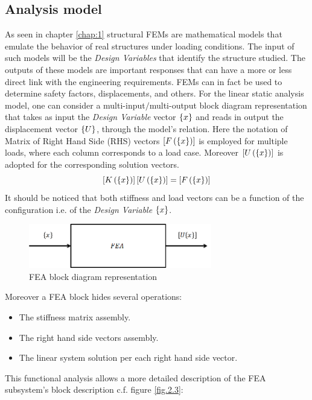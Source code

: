 \subsection {Analysis model}
As seen in chapter \ref{chap:1} structural FEMs are mathematical models that emulate the behavior of real structures under loading conditions. The input of such models will be the \textit{Design Variables} that identify the structure studied. The outputs of these models are important responses that can have a more or less direct link with the engineering requirements. FEMs can in fact be used to determine safety factors, displacements, and others. For the linear static analysis model, one can consider a multi-input$/$multi-output block diagram representation that takes as input the \textit{Design Variable} vector $\left\lbrace{x}\right \rbrace$ and reads in output the displacement vector $\left\lbrace{U}\right \rbrace$, through the model's relation. Here the notation of Matrix of Right Hand Side (RHS) vectors $\left[{F\left(\left\lbrace{x}\right \rbrace\right)}\right]$ is employed for multiple loads, where each column corresponds to a load case. Moreover $\left[{U\left(\left\lbrace{x}\right \rbrace\right)}\right]$ is adopted for the corresponding solution vectors.
\begin{equation}
\label{eq2.1}
\left[{K\left(\left\lbrace{x}\right \rbrace\right)}\right]\left[{U\left(\left\lbrace{x}\right \rbrace\right)}\right]=\left[{F\left(\left\lbrace{x}\right \rbrace\right)}\right]
\end{equation}
It should be noticed that both stiffness and load vectors can be a function of the configuration i.e. of the  \textit{Design Variable} $\left\lbrace{x}\right \rbrace$.
\begin{figure}[ht]
\centering
\includegraphics[width=8cm]{images/Ch2/Block_diagram_FEA}
\caption{FEA block diagram representation}
\label{fig.2.2}
\end{figure}
Moreover a FEA block hides several operations:
\begin{itemize}
\item The stiffness matrix assembly.
\item The right hand side vectors assembly.
\item The linear system solution per each right hand side vector.
\end{itemize}
This functional analysis allows a more detailed description of the FEA subsystem's block description c.f. figure \ref{fig.2.3}:\\

